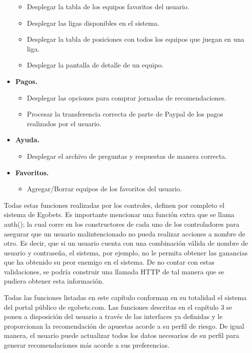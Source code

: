 \begin{itemize}
			\begin{itemize}
				\item Desplegar la tabla de los equipos favoritos del usuario.
				\item Desplegar las ligas disponibles en el sistema.
				\item Desplegar la tabla de posiciones con todos los equipos que juegan en una liga.
				\item Desplegar la pantalla de detalle de un equipo.
			\end{itemize}
			\item \textbf{Pagos.}
			\begin{itemize}
				\item Desplegar las opciones para comprar jornadas de recomendaciones.
				\item Procesar la transferencia correcta de parte de Paypal de los pagos realizados por el usuario.
			\end{itemize}
			\item \textbf{Ayuda.}
			\begin{itemize}
				\item Desplegar el archivo de preguntas y respuestas de manera correcta.
			\end{itemize}
			\item \textbf{Favoritos.}
			\begin{itemize}
				\item Agregar/Borrar equipos de los favoritos del usuario.
			\end{itemize}

		\end{itemize}

Todas estas funciones realizadas por los controles, definen por completo el sistema de Egobets. Es importante mencionar una función extra que se llama auth(); la cual corre en los constructores de cada uno de los controladores para asegurar que un usuario malintencionado no pueda realizar acciones a nombre de otro. Es decir, que si un usuario cuenta con una combinación válida de nombre de usuario y contraseña, el sistema, por ejemplo, no le permita obtener las ganancias que ha obtenido su peor enemigo en el sistema. De no contar con estas validaciones, se podría construir una llamada HTTP de tal manera que se pudiera obtener esta información.

Todas las funciones listadas en este capítulo conforman en su totalidad el sistema del portal público de egobets.com. Las funciones descritas en el capítulo 3 se ponen a disposición del usuario a través de las interfaces ya definidas y le proporcionan la recomendación de apuestas acorde a su perfil de riesgo. De igual manera, el usuario puede actualizar todos los datos necesarios de su perfil para generar recomendaciones más acorde a sus preferencias.

